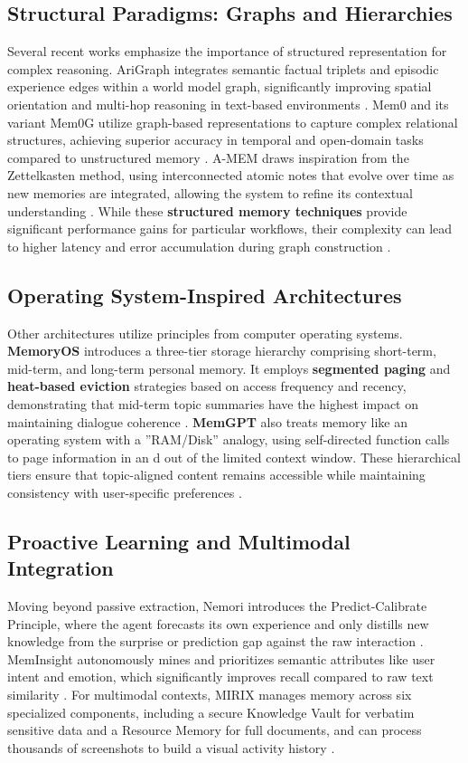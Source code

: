 \documentclass[conference]{IEEEtran}
\begin{document}
\subsection{Structural Paradigms: Graphs and Hierarchies}
Several recent works emphasize the importance of structured representation for complex reasoning. AriGraph integrates semantic factual triplets and episodic experience edges within a world model graph, significantly improving spatial orientation and multi-hop reasoning in text-based environments \cite{Anokhin2024AriGraph:}. Mem0 and its variant Mem0G utilize graph-based representations to capture complex relational structures, achieving superior accuracy in temporal and open-domain tasks compared to unstructured memory \cite{Chhikara2025Mem0:}. A-MEM draws inspiration from the Zettelkasten method, using interconnected atomic notes that evolve over time as new memories are integrated, allowing the system to refine its contextual understanding \cite{Xu2025A-MEM:}. While these \textbf{structured memory techniques} provide significant performance gains for particular workflows, their complexity can lead to higher latency and error accumulation during graph construction \cite{Chhikara2025Mem0:}.

\subsection{Operating System-Inspired Architectures}
Other architectures utilize principles from computer operating systems. \textbf{MemoryOS} introduces a three-tier storage hierarchy comprising short-term, mid-term, and long-term personal memory. It employs \textbf{segmented paging} and \textbf{heat-based eviction} strategies based on access frequency and recency, demonstrating that mid-term topic summaries have the highest impact on maintaining dialogue coherence \cite{Kang2025Memory}. \textbf{MemGPT} also treats memory like an operating system with a ''RAM/Disk'' analogy, using self-directed function calls to page information in an d out of the limited context window. These hierarchical tiers ensure that topic-aligned content remains accessible while maintaining consistency with user-specific preferences \cite{Packer2023MemGPT}.

\subsection{Proactive Learning and Multimodal Integration}
Moving beyond passive extraction, Nemori introduces the Predict-Calibrate Principle, where the agent forecasts its own experience and only distills new knowledge from the surprise or prediction gap against the raw interaction \cite{Nan2025Nemori:}. MemInsight autonomously mines and prioritizes semantic attributes like user intent and emotion, which significantly improves recall compared to raw text similarity \cite{Salama2025MemInsight}. For multimodal contexts, MIRIX manages memory across six specialized components, including a secure Knowledge Vault for verbatim sensitive data and a Resource Memory for full documents, and can process thousands of screenshots to build a visual activity history \cite{Wang2025MIRIX:}.
\end{document}
